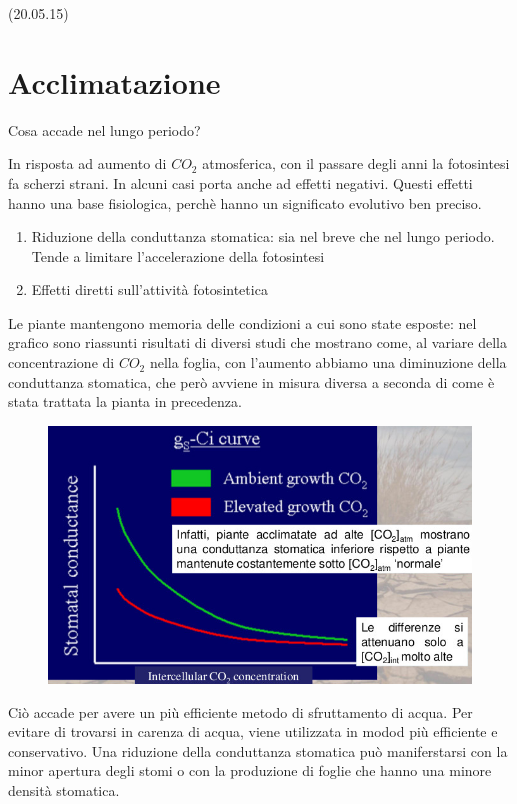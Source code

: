 \documentclass[a4paper,12pt]{book}
\begin{document}
(20.05.15)    
    
\section{Acclimatazione}
Cosa accade nel lungo periodo?

In risposta ad aumento di $CO_{2}$  atmosferica, con il passare degli anni la fotosintesi fa scherzi strani. In alcuni casi porta anche ad effetti negativi. Questi effetti hanno una base fisiologica, perchè hanno un significato evolutivo ben preciso.

\begin{enumerate}
\item{Riduzione della conduttanza stomatica: sia nel breve che nel lungo periodo. Tende a limitare l'accelerazione della fotosintesi}
\item{Effetti diretti sull'attività fotosintetica}
\end{enumerate}
Le piante mantengono memoria delle condizioni a cui sono state esposte: nel grafico sono riassunti risultati di diversi studi che mostrano come, al variare della concentrazione di $CO_{2}$  nella foglia, con l'aumento abbiamo una diminuzione della conduttanza stomatica, che però avviene in misura diversa a seconda di come è stata trattata la pianta in precedenza.

\begin{figure}[H]
\centering
\includegraphics[scale=0.4]{immagini/acclimatazione.jpg}
\end{figure}

Ciò accade per avere un più efficiente metodo di sfruttamento di acqua. Per evitare di trovarsi in carenza di acqua, viene utilizzata in modod più efficiente e conservativo. Una riduzione della conduttanza stomatica può maniferstarsi con la minor apertura degli stomi o con la produzione di foglie che hanno una minore densità stomatica.
\end{document}
